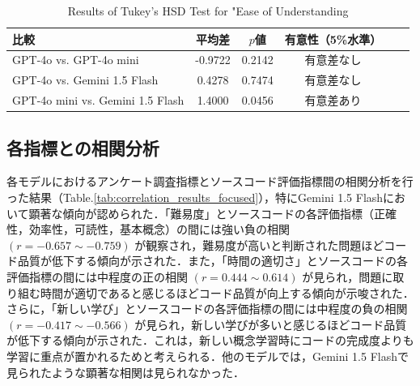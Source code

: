\documentclass[twocolumn, fleqn, uplatex]{jsarticle}
\begin{document}
\begin{table}[t]
\centering
\scriptsize
\caption{Results of Tukey's HSD Test for "Ease of Understanding}
\label{tab:tukey_hsd_understanding}
\begin{tabular}{lccccc}
\hline
比較 & 平均差 & $p$値  & 有意性（5\%水準） \\
\hline
GPT-4o vs. GPT-4o mini & -0.9722 & 0.2142  & 有意差なし \\
GPT-4o vs. Gemini 1.5 Flash & 0.4278 & 0.7474  & 有意差なし \\
GPT-4o mini vs. Gemini 1.5 Flash & 1.4000 & 0.0456 & 有意差あり \\
\hline
\end{tabular}
\end{table}

\subsection{各指標との相関分析}

各モデルにおけるアンケート調査指標とソースコード評価指標間の相関分析を行った結果（Table.\ref{tab:correlation_results_focused}），特にGemini 1.5 Flashにおいて顕著な傾向が認められた．「難易度」とソースコードの各評価指標（正確性，効率性，可読性，基本概念）の間には強い負の相関 $(r=−0.657\sim−0.759)$ が観察され，難易度が高いと判断された問題ほどコード品質が低下する傾向が示された．また，「時間の適切さ」とソースコードの各評価指標の間には中程度の正の相関 $(r=0.444\sim0.614)$ が見られ，問題に取り組む時間が適切であると感じるほどコード品質が向上する傾向が示唆された．さらに，「新しい学び」とソースコードの各評価指標の間には中程度の負の相関 $(r=−0.417\sim−0.566)$ が見られ，新しい学びが多いと感じるほどコード品質が低下する傾向が示された．これは，新しい概念学習時にコードの完成度よりも学習に重点が置かれるためと考えられる．他のモデルでは，Gemini 1.5 Flashで見られたような顕著な相関は見られなかった．
\end{document}
